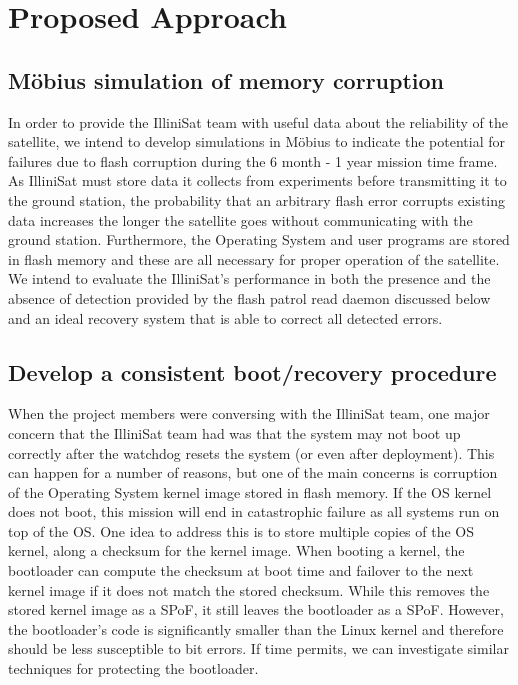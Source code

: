 \section{Proposed Approach}
\subsection{M\"obius simulation of memory corruption}
In order to provide the IlliniSat team with useful data about the reliability of
the satellite, we intend to develop simulations in M\"obius to indicate the
potential for failures due to flash corruption during the 6 month - 1 year
mission time frame.  As IlliniSat must store data it collects from experiments
before transmitting it to the ground station, the probability that an arbitrary
flash error corrupts existing data increases the longer the satellite goes
without communicating with the ground station.  Furthermore, the Operating
System and user programs are stored in flash memory and these are all necessary
for proper operation of the satellite.  We intend to evaluate the IlliniSat's
performance in both the presence and the absence of detection provided by the flash patrol read daemon discussed below and an ideal recovery system that is able to correct all detected errors.

\subsection{Develop a consistent boot/recovery procedure}
When the project members were conversing with the IlliniSat team, one major
concern that the IlliniSat team had was that the system may not boot up
correctly after the watchdog resets the system (or even after deployment).  This
can happen for a number of reasons, but one of the main concerns is corruption
of the Operating System kernel image stored in flash memory.  If the OS kernel
does not boot, this mission will end in catastrophic failure as all systems run
on top of the OS.  One idea to address this is to store multiple copies of the
OS kernel, along a checksum for the kernel image.  When booting a kernel, the
bootloader can compute the checksum at boot time and failover to the next kernel
image if it does not match the stored checksum.  While this removes the stored
kernel image as a SPoF, it still leaves the bootloader as a SPoF.  However, the
bootloader's code is significantly smaller than the Linux kernel and therefore
should be less susceptible to bit errors.  If time permits, we can investigate
similar techniques for protecting the bootloader. 

